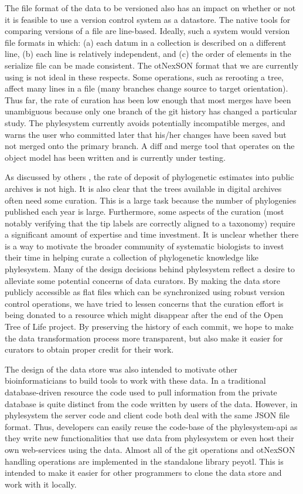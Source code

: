\documentclass{bioinfo}
\newcommand{\ps}{phylesystem\xspace}
\newcommand{\otol}{Open Tree of Life\xspace}
\newcommand{\nexson}{otNexSON\xspace}
\begin{document}
The file format of the data to be versioned also has an impact on whether or not it is feasible
    to use a version control system as a datastore.
The native tools for comparing versions of a file are line-based.
Ideally, such a system would version file formats in which:
    (a) each datum in a collection is described on a different line, 
    (b) each line is relatively independent, and 
    (c) the order of elements in the serialize file can be made consistent.
The \nexson format that we are currently using is not ideal in these respects.
Some operations, such as rerooting a tree,
    affect many lines in a file (many branches change source to target orientation).
Thus far, the rate of curation has been low enough that most merges have been unambiguous because
    only one branch of the git history has changed a particular study.
The \ps currently avoids potentially incompatible merges, and warns the user who committed later that his/her
    changes have been saved but not merged onto the primary branch.
A diff and merge tool that operates on the object model has been
    written and is currently under testing.

As discussed by others \citep{DrewEtAl2013,MageeMM2014}, the rate of deposit of phylogenetic
    estimates into public archives is not high.
It is also clear that the trees available in digital archives often need some curation.
This is a large task because the number of phylogenies published each year is large.
Furthermore, some aspects of the curation (most notably verifying that the tip labels are correctly
    aligned to a taxonomy) require a significant amount of expertise and time investment.
It is unclear whether there is a way to motivate the broader community of systematic biologists to
    invest their time in helping curate a collection of phylogenetic knowledge like \ps.
Many of the design decisions behind \ps reflect a desire to alleviate some potential concerns
    of data curators.
By making the data store publicly accessible as flat files which can be synchronized using robust
    version control operations, we have tried to lessen
    concerns that the curation effort is being donated to a resource which might disappear
    after the end of the \otol project.
By preserving the history of each commit, we hope to make the data transformation process more 
    transparent, but also make it easier for curators to obtain proper credit for their work.

The design of the data store was also intended to motivate other bioinformaticians to
    build tools to work with these data.
In a traditional database-driven resource the code used to pull information from the private
    database is quite distinct from the code written by users of the data.
However, in \ps the server code and client code both deal with the same JSON file format.
Thus, developers can easily reuse the code-base of the \ps-api as they write new functionalities
    that use data from \ps or even host their own web-services using the data.
Almost all of the git operations and \nexson handling operations are implemented in the standalone
    library peyotl.
This is intended to make it easier for other programmers to clone
    the data store and work with it locally.
\end{document}
